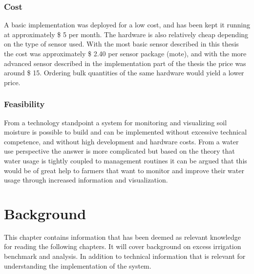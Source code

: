 \documentclass[]{uiophd}
\begin{document}
\subsection{Cost}
A basic implementation was deployed for a low cost, and has been kept it running at approximately \$ 5 per month. The hardware is also relatively cheap depending on the type of sensor used. With the most basic sensor described in this thesis the cost was approximately \$ 2.40 per sensor package (mote), and with the more advanced sensor described in the implementation part of the thesis the price was around \$ 15. Ordering bulk quantities of the same hardware would yield a lower price.

\subsection{Feasibility}
From a technology standpoint a system for monitoring and visualizing soil moisture is possible to build and can be implemented without excessive technical competence, and without high development and hardware costs. From a water use perspective the answer is more complicated but based on the theory that water usage is tightly coupled to management routines it can be argued that this would be of great help to farmers that want to monitor and improve their water usage through increased information and visualization.


\chapter{Background}

This chapter contains information that has been deemed as relevant knowledge for reading the  following chapters. It will cover background on excess irrigation benchmark and analysis. In addition to technical information that is relevant for understanding the implementation of the system.
\end{document}

